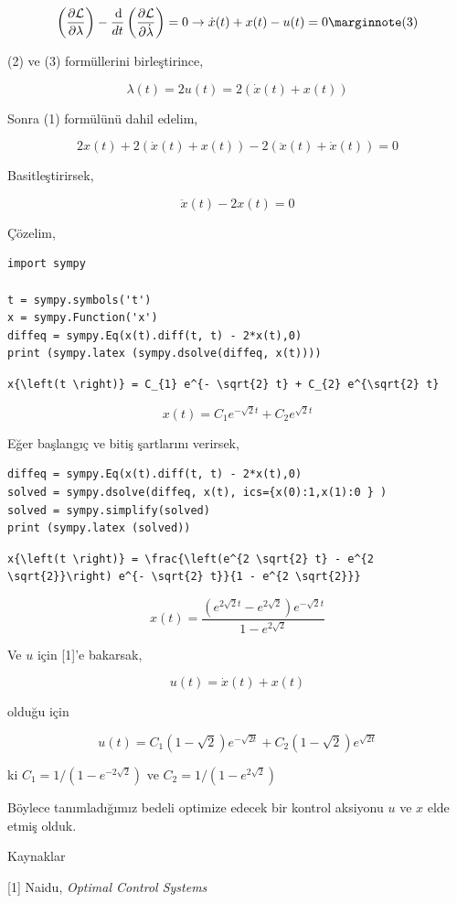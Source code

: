 \documentclass[12pt,fleqn]{article}\usepackage{../../common}
\begin{document}
$$
\left( \frac{\partial \mathcal{L}}{\partial \lambda} \right) -
\frac{\ud}{dt} \left( \frac{\partial \mathcal{L}}{\partial \dot{\lambda}} \right) =
0 \to \dot{x}(t) + x(t) - u(t) = 0
\mlabel{3}
$$

(2) ve (3) formüllerini birleştirince,

$$
\lambda(t) = 2 u(t) = 2 (\dot{x}(t) + x(t) )
$$

Sonra (1) formülünü dahil edelim,

$$
2 x(t) + 2 (\dot{x}(t) + x(t)) - 2(\ddot{x}(t) + \dot{x}(t) ) = 0
$$

Basitleştirirsek, 

$$
\ddot{x}(t) - 2x(t) = 0
$$

Çözelim,

\begin{verbatim}
import sympy

t = sympy.symbols('t')
x = sympy.Function('x')
diffeq = sympy.Eq(x(t).diff(t, t) - 2*x(t),0)
print (sympy.latex (sympy.dsolve(diffeq, x(t))))
\end{verbatim}

\begin{verbatim}
x{\left(t \right)} = C_{1} e^{- \sqrt{2} t} + C_{2} e^{\sqrt{2} t}
\end{verbatim}

$$
x{\left(t \right)} = C_{1} e^{- \sqrt{2} t} + C_{2} e^{\sqrt{2} t}
$$

Eğer başlangıç ve bitiş şartlarını verirsek,

\begin{verbatim}
diffeq = sympy.Eq(x(t).diff(t, t) - 2*x(t),0)
solved = sympy.dsolve(diffeq, x(t), ics={x(0):1,x(1):0 } ) 
solved = sympy.simplify(solved)
print (sympy.latex (solved))
\end{verbatim}

\begin{verbatim}
x{\left(t \right)} = \frac{\left(e^{2 \sqrt{2} t} - e^{2 \sqrt{2}}\right) e^{- \sqrt{2} t}}{1 - e^{2 \sqrt{2}}}
\end{verbatim}

$$
x{\left(t \right)} = \frac{\left(e^{2 \sqrt{2} t} - e^{2 \sqrt{2}}\right) e^{- \sqrt{2} t}}{1 - e^{2 \sqrt{2}}}
$$

Ve $u$ için [1]'e bakarsak, 

$$
u(t) = \dot{x}(t) + x(t) 
$$

olduğu için

$$
u(t) = C_1(1-\sqrt{2}) e^{-\sqrt{2t}} + C_2(1-\sqrt{2}) e^{\sqrt{2t}} 
$$

ki $C_1 = 1/(1-e^{-2\sqrt{2}})$ ve $C_2 = 1/(1-e^{2\sqrt{2}})$

Böylece tanımladığımız bedeli optimize edecek bir kontrol aksiyonu $u$ ve
$x$ elde etmiş olduk. 

Kaynaklar

[1] Naidu, {\em Optimal Control Systems}
\end{document}

